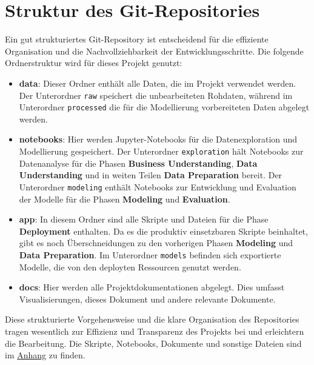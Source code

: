 \documentclass[%
pdftex,
oneside,			%
11pt,				%
parskip=half,		%
headheight = 12pt,	%
headsepline,		%
footsepline,		%
footheight = 16pt,	%
abstracton,		%
DIV=calc,		%
BCOR=8mm,		%
headinclude=false,	%
footinclude=false,	%
listof=totoc,		%
toc=bibliography,	%
]{scrreprt}	%
\begin{document}
    \section{Struktur des Git-Repositories}

        Ein gut strukturiertes Git-Repository ist entscheidend für die effiziente Organisation und die Nachvollziehbarkeit der Entwicklungsschritte. 
        Die folgende Ordnerstruktur wird für dieses Projekt genutzt:


        \begin{itemize}
            \item \textbf{data}: Dieser Ordner enthält alle Daten, die im Projekt verwendet werden. 
            Der Unterordner \texttt{raw} speichert die unbearbeiteten Rohdaten, während im Unterordner \texttt{processed} die für die Modellierung vorbereiteten Daten abgelegt werden.
            \item \textbf{notebooks}: Hier werden Jupyter-Notebooks für die Datenexploration und Modellierung gespeichert. 
            Der Unterordner \texttt{exploration} hält Notebooks zur Datenanalyse für die Phasen \textbf{Business Understanding}, \textbf{Data Understanding} und in weiten Teilen \textbf{Data Preparation} bereit.
            Der Unterordner \texttt{modeling} enthält Notebooks zur Entwicklung und Evaluation der Modelle für die Phasen \textbf{Modeling} und \textbf{Evaluation}.
            \item \textbf{app}: In diesem Ordner sind alle Skripte und Dateien für die Phase \textbf{Deployment} enthalten.
            Da es die produktiv einsetzbaren Skripte beinhaltet, gibt es noch Überschneidungen zu den vorherigen Phasen \textbf{Modeling} und \textbf{Data Preparation}.
            Im Unterordner \texttt{models} befinden sich exportierte Modelle, die von den deployten Ressourcen genutzt werden.
            \item \textbf{docs}: Hier werden alle Projektdokumentationen abgelegt. 
            Dies umfasst Visualisierungen, dieses Dokument und andere relevante Dokumente.
        \end{itemize}

        Diese strukturierte Vorgehensweise und die klare Organisation des Repositories tragen wesentlich zur Effizienz und Transparenz des Projekts bei und erleichtern die Bearbeitung.
        Die Skripte, Notebooks, Dokumente und sonstige Dateien sind im \hyperref[sec:appendix]{Anhang} zu finden.
\end{document}
